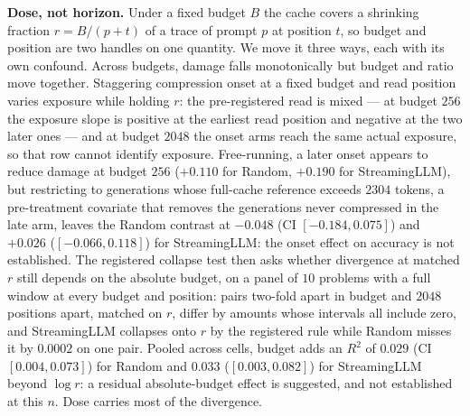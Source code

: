 \documentclass{article}
\begin{document}
\textbf{Dose, not horizon.} Under a fixed budget $B$ the cache covers a
shrinking fraction $r = B/(p + t)$ of a trace of prompt $p$ at position $t$, so
budget and position are two handles on one quantity. We move it three ways,
each with its own confound. Across budgets, damage falls monotonically but
budget and ratio move together. Staggering compression onset at a fixed budget
and read position varies exposure while holding $r$: the pre-registered read is
mixed --- at budget $256$ the exposure slope is positive at the earliest read
position and negative at the two later ones --- and at budget $2048$ the onset
arms reach the same actual exposure, so that row cannot identify exposure.
Free-running, a later onset appears to reduce damage at budget $256$
($+0.110$ for Random, $+0.190$ for StreamingLLM), but restricting to generations
whose full-cache reference exceeds $2304$ tokens, a pre-treatment covariate that
removes the generations never compressed in the late arm, leaves the Random contrast at
$-0.048$ (CI $[-0.184, 0.075]$) and $+0.026$ ($[-0.066, 0.118]$) for StreamingLLM: the onset
effect on accuracy is not established. The registered collapse test then asks
whether divergence at matched $r$ still depends on the absolute budget, on a
panel of $10$ problems with a full window at every budget and position: pairs
two-fold apart in budget and $2048$ positions apart, matched on $r$, differ by
amounts whose intervals all include zero, and StreamingLLM collapses onto $r$
by the registered rule while Random misses it by $0.0002$ on one pair. Pooled
across cells, budget adds an $R^2$ of $0.029$ (CI $[0.004, 0.073]$) for Random and
$0.033$ ($[0.003, 0.082]$) for StreamingLLM beyond $\log r$: a residual
absolute-budget effect is suggested, and not established at this $n$. Dose
carries most of the divergence.
\end{document}
